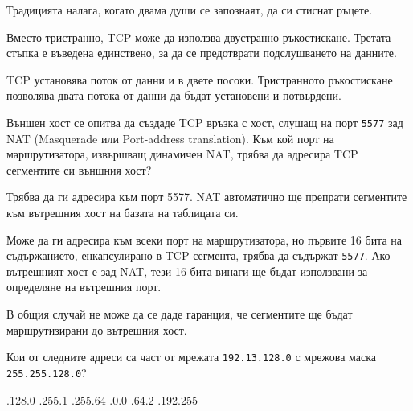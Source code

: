 \begin{questions}
\begin{choices}
    \choice Традицията налага, когато двама души се запознаят, да си стиснат
    ръцете.

    \choice Вместо тристранно, TCP може да използва двустранно
    ръкостискане. Третата стъпка е въведена единствено, за да се предотврати
    подслушването на данните.

    \CorrectChoice TCP установява поток от данни и в двете посоки. Тристранното
    ръкостискане позволява двата потока от данни да бъдат установени и потвърдени.
  \end{choices}

  \question[7] Външен хост се опитва да създаде TCP връзка с хост, слушащ на
  порт \texttt{5577} зад NAT (\foreignlanguage{english}{Masquerade} или
  \foreignlanguage{english}{Port-address translation}). Към кой порт на
  маршрутизатора, извършващ динамичен NAT, трябва да адресира TCP сегментите си
  външния хост?

  \begin{choices}
    \choice Трябва да ги адресира към порт 5577. NAT автоматично ще препрати
    сегментите към вътрешния хост на базата на таблицата си.

    \choice Може да ги адресира към всеки порт на маршрутизатора, но първите 16
    бита на съдържанието, енкапсулирано в TCP сегмента, трябва да съдържат
    \texttt{5577}. Ако вътрешният хост е зад NAT, тези 16 бита винаги ще бъдат
    използвани за определяне на вътрешния порт.

    \CorrectChoice В общия случай не може да се даде гаранция, че сегментите ще
    бъдат маршрутизирани до вътрешния хост.
  \end{choices}

  \question[10] Кои от следните адреси са част от мрежата \texttt{192.13.128.0} с
  мрежова маска \texttt{255.255.128.0}?
  \begin{choices}
    .128.0
    .255.1
    .255.64
    .0.0
    .64.2
    .192.255
  \end{choices}

  \begin{center}
\end{center}
\end{questions}
